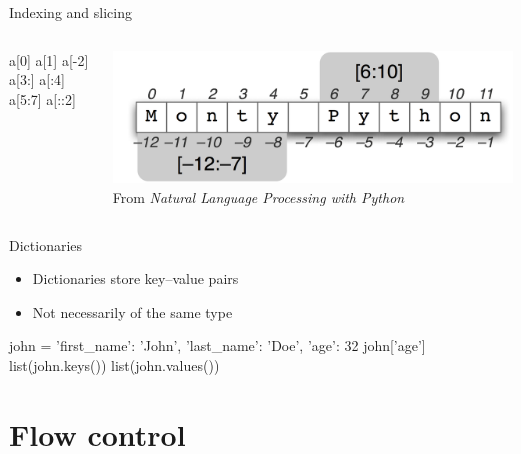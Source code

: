 \begin{frame}[fragile]{Indexing and slicing}
    \begin{columns}
        \begin{column}{0.2\textwidth}
            \begin{py3}
                a[0]
                a[1]
                a[-2]
                a[3:]
                a[:4]
                a[5:7]
                a[::2]
            \end{py3}
        \end{column}
        \begin{column}{0.8\textwidth}
            \begin{center}
                \includegraphics[width=\textwidth]{figures/py_str} \\
                {\scriptsize%
                 From \textit{Natural Language Processing with Python}}
            \end{center}
        \end{column}
    \end{columns}
\end{frame}

\begin{frame}[fragile]{Dictionaries}
    \begin{itemize}
        \item Dictionaries store \alert{key--value pairs}
        \item Not necessarily of the same type
    \end{itemize}
    \vfill
    \begin{py3}
        john = {
            'first_name': 'John',
            'last_name': 'Doe',
            'age': 32
        }
        john['age']
        list(john.keys())
        list(john.values())
    \end{py3}
\end{frame}

\section{Flow control}

